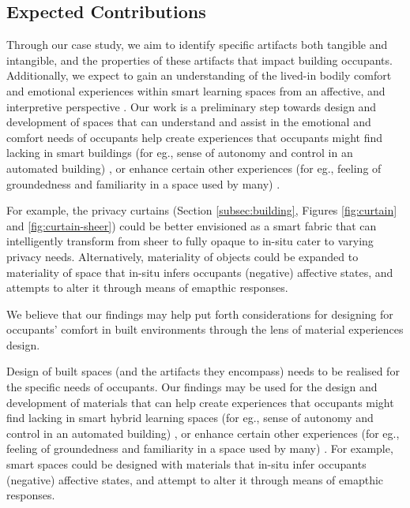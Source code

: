 \documentclass[manuscript, anonymous, review]{acmart}
\begin{document}
\subsection{Expected Contributions}
Through our case study, we aim to identify specific artifacts both tangible and intangible, and the properties of these artifacts that impact building occupants. Additionally, we expect to gain an understanding of the lived-in bodily comfort and emotional experiences within smart learning spaces from an affective, and interpretive perspective \cite{giaccardi2015foundations}. Our work is a preliminary step towards design and development of spaces that can understand and assist in the emotional and comfort needs of occupants help create experiences that occupants might find lacking in smart buildings (for eg., sense of autonomy and control in an automated building) \cite{moreno2014user}, or enhance certain other experiences (for eg., feeling of groundedness and familiarity in a space used by many) \cite{rehman2022personalisedcomfort}.

For example, the privacy curtains (Section \ref{subsec:building}, Figures \ref{fig:curtain} and \ref{fig:curtain-sheer}) could be better envisioned as a smart fabric that can intelligently transform from sheer to fully opaque to in-situ cater to varying privacy needs. Alternatively, materiality of objects could be expanded to materiality of space that in-situ infers occupants (negative) affective states, and attempts to alter it through means of emapthic responses. 





We believe that our findings may help put forth considerations for designing for occupants' comfort in built environments through the lens of material experiences design. 

Design of built spaces (and the artifacts they encompass) needs to be realised for the specific needs of occupants. Our findings may be used for the design and development of materials that can help create experiences that occupants might find lacking in smart hybrid learning spaces (for eg., sense of autonomy and control in an automated building) \cite{moreno2014user}, or enhance certain other experiences (for eg., feeling of groundedness and familiarity in a space used by many) \cite{rehman2022personalisedcomfort}.  For example, 
smart spaces could be designed with materials that in-situ infer occupants (negative) affective states, and attempt to alter it through means of emapthic responses. 
\end{document}
